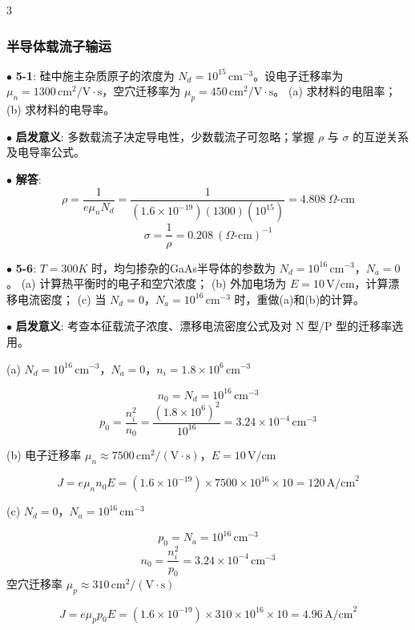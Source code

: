 \documentclass[10pt, a4paper, landscape]{article}
\newcommand{\entry}[2]{$\bullet$ \textbf{#1}: #2\par\vspace{0.5pt}}
\begin{document}
\begin{multicols*}{3}
\subsubsection{半导体载流子输运}


\entry{5-1}{
    硅中施主杂质原子的浓度为 $N_{d}=10^{15}\,\mathrm{cm}^{-3}$。设电子迁移率为 $\mu_{n}=1300\,\mathrm{cm}^2/\mathrm{V}\cdot\mathrm{s}$，空穴迁移率为 $\mu_{p}=450\,\mathrm{cm}^2/\mathrm{V}\cdot\mathrm{s}$。
    (a) 求材料的电阻率；
    (b) 求材料的电导率。
}

\entry{启发意义}{多数载流子决定导电性，少数载流子可忽略；掌握 $\rho$ 与 $\sigma$ 的互逆关系及电导率公式。}

\entry{解答}{
\[
\rho=\frac{1}{e\mu_n N_d}=\frac{1}{(1.6\times10^{-19})(1300)(10^{15})}=4.808\ \Omega\text{-cm}
\]
\[
\sigma=\frac{1}{\rho}=0.208\ (\Omega\text{-cm})^{-1}
\]
}


\entry{5-6}{
$T=300K$ 时，均匀掺杂的GaAs半导体的参数为 $N_{d}=10^{16}\,\mathrm{cm}^{-3}$，$N_{a}=0$。
(a) 计算热平衡时的电子和空穴浓度；
(b) 外加电场为 $E=10\,\mathrm{V/cm}$，计算漂移电流密度；
(c) 当 $N_{d}=0$，$N_{a}=10^{16}\,\mathrm{cm}^{-3}$ 时，重做(a)和(b)的计算。
}
\entry{启发意义}{
考查本征载流子浓度、漂移电流密度公式及对 N 型/P 型的迁移率选用。
}

(a) $N_d=10^{16}\,\mathrm{cm}^{-3}$，$N_a=0$，$n_i=1.8\times10^6\,\mathrm{cm}^{-3}$

\[
n_0 = N_d = 10^{16}\,\mathrm{cm}^{-3}
\]
\[
p_0 = \frac{n_i^2}{n_0} = \frac{(1.8\times10^6)^2}{10^{16}} = 3.24\times10^{-4}\,\mathrm{cm}^{-3}
\]

(b) 电子迁移率 $\mu_n \approx 7500\,\mathrm{cm}^2/(\mathrm{V}\cdot\mathrm{s})$，$E=10\,\mathrm{V/cm}$

\[
J = e\mu_n n_0 E = (1.6\times10^{-19}) \times 7500 \times 10^{16} \times 10 = 120\,\mathrm{A/cm}^2
\]

(c) $N_d=0$，$N_a=10^{16}\,\mathrm{cm}^{-3}$

\[
p_0 = N_a = 10^{16}\,\mathrm{cm}^{-3}
\]
\[
n_0 = \frac{n_i^2}{p_0} = 3.24\times10^{-4}\,\mathrm{cm}^{-3}
\]
空穴迁移率 $\mu_p \approx 310\,\mathrm{cm}^2/(\mathrm{V}\cdot\mathrm{s})$

\[
J = e\mu_p p_0 E = (1.6\times10^{-19}) \times 310 \times 10^{16} \times 10 = 4.96\,\mathrm{A/cm}^2
\]




\end{multicols*}
\end{document}
